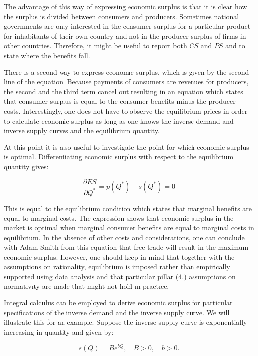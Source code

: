 \documentclass[
]{book}
\begin{document}
The advantage of this way of expressing economic surplus is that it is clear how the surplus is divided between consumers and producers. Sometimes national governments are only interested in the consumer surplus for a particular product for inhabitants of their own country and not in the producer surplus of firms in other countries. Therefore, it might be useful to report both \(CS\) and \(PS\) and to state where the benefits fall.

There is a second way to express economic surplus, which is given by the second line of the equation. Because payments of consumers are revenues for producers, the second and the third term cancel out resulting in an equation which states that consumer surplus is equal to the consumer benefits minus the producer costs. Interestingly, one does not have to observe the equilibrium prices in order to calculate economic surplus as long as one knows the inverse demand and inverse supply curves and the equilibrium quantity.

At this point it is also useful to investigate the point for which economic surplus is optimal. Differentiating economic surplus with respect to the equilibrium quantity gives:

\begin{equation}
\frac{\partial ES}{\partial Q^\ast} = p(Q^\ast) - s(Q^\ast) = 0
\end{equation}

This is equal to the equilibrium condition which states that marginal benefits are equal to marginal costs. The expression shows that economic surplus in the market is optimal when marginal consumer benefits are equal to marginal costs in equilibrium. In the absence of other costs and considerations, one can conclude with Adam Smith from this equation that free trade will result in the maximum economic surplus. However, one should keep in mind that together with the assumptions on rationality, equilibrium is imposed rather than empirically supported using data analysis and that particular pillar (4.) assumptions on normativity are made that might not hold in practice.

Integral calculus can be employed to derive economic surplus for particular specifications of the inverse demand and the inverse supply curve. We will illustrate this for an example. Suppose the inverse supply curve is exponentially increasing in quantity and given by:

\begin{equation}
s(Q) = B e^{bQ}, \quad B>0, \quad b >0.
\end{equation}
\end{document}
